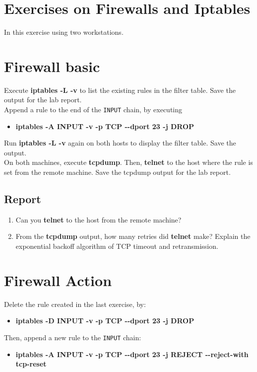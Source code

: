 \documentclass[10pt,a4paper]{article}
\numberwithin{equation}{section}
\numberwithin{figure}{section}
\numberwithin{table}{section}
\begin{document}
\section*{Exercises on Firewalls and Iptables}
	In this exercise using two workstations.

\section{Firewall basic}
	Execute \textbf{iptables -L -v} to list the existing rules in the filter table. Save the output for the lab report.\\
	Append a rule to the end of the \texttt{INPUT} chain, by executing
	\begin{itemize}
		\setlength{\itemindent}{10pt}
		\item \textbf{iptables -A INPUT -v -p TCP -{}-dport 23 -j DROP} 
	\end{itemize}
	
	\setlength{\parindent}{0pt}
	Run \textbf{iptables -L -v} again on both hosts to display the filter table. Save the output.\\
	On both machines, execute \textbf{tcpdump}. Then, \textbf{telnet} to the host where the rule is set from the remote machine. Save the tcpdump output for the lab report.

	\subsection*{Report}
	\begin{enumerate}
		\item Can you \textbf{telnet} to the host from the remote machine?
		\item From the \textbf{tcpdump} output, how many retries did \textbf{telnet} make? Explain the exponential backoff algorithm of TCP timeout and retransmission.
	\end{enumerate}
	
\section{Firewall Action}
	Delete the rule created in the last exercise, by:	
	\begin{itemize}
		\item \textbf{iptables -D INPUT -v -p TCP -{}-dport 23 -j DROP}
	\end{itemize}
	
	Then, append a new rule to the \texttt{INPUT} chain:	
	\begin{itemize}
		\item \textbf{iptables -A INPUT -v -p TCP -{}-dport 23 -j REJECT -{}-reject-with tcp-reset} 
	\end{itemize}
	
\end{document}
